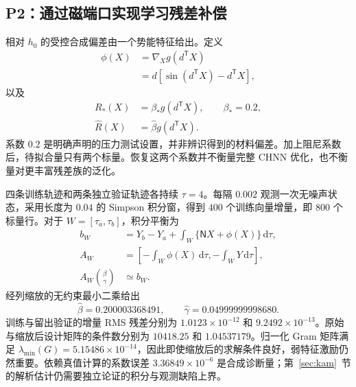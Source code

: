 \subsection{P2：通过磁端口实现学习残差补偿}
\label{num:p2}
\label{num:route-a}
相对 $h_0$ 的受控合成偏差由一个势能特征给出。定义
\begin{equation}
 \begin{split}
 \phi(X)&=\nabla_X g(d^{\mathsf T}X)\\
        &=d[\sin(d^{\mathsf T}X)-d^{\mathsf T}X],
 \end{split}
 \label{num:feature-gradient}
\end{equation}
以及
\begin{equation}
 \begin{split}
 R_*(X)&=\beta_*g(d^{\mathsf T}X),\qquad \beta_*=0.2,\\
 \widehat R(X)&=\widehat\beta g(d^{\mathsf T}X).
 \end{split}
 \label{num:feature}
\end{equation}
系数 $0.2$ 是明确声明的压力测试设置，并非辨识得到的材料偏差。加上阻尼系数后，待拟合量只有两个标量。恢复这两个系数并不衡量完整 CHNN 优化，也不衡量对更丰富残差族的泛化。

\label{num:identification}
四条训练轨迹和两条独立验证轨迹各持续 $\tau=4$。每隔 $0.002$ 观测一次无噪声状态，采用长度为 $0.04$ 的 Simpson 积分窗，得到 $400$ 个训练向量增量，即 $800$ 个标量行。对于 $W=[\tau_a,\tau_b]$，积分平衡为
\begin{equation}
 \begin{split}
 b_W&=Y_b-Y_a+\int_W\{\mathsf NX+\phi(X)\}\,\mathrm d\tau,\\
 A_W&=\left[-\int_W\phi(X)\,\mathrm d\tau,
                 -\int_WY\,\mathrm d\tau\right],\\
 A_W\binom{\beta}{\gamma}&\simeq b_W.
 \end{split}
 \label{num:regression}
\end{equation}
经列缩放的无约束最小二乘给出
\begin{equation}
 \widehat\beta=0.200003368491,\qquad
 \widehat\gamma=0.04999999998680.
 \label{num:fitted-values}
\end{equation}
训练与留出验证的增量 RMS 残差分别为 $1.0123\times10^{-12}$ 和 $9.2492\times10^{-13}$。原始与缩放后设计矩阵的条件数分别为 $10418.25$ 和 $1.04537179$。归一化 Gram 矩阵满足 $\lambda_{\min}(G)=5.15486\times10^{-14}$，因此即使缩放后的求解条件良好，弱特征激励仍然重要。依赖真值计算的系数误差 $3.36849\times10^{-6}$ 是合成诊断量；第~\ref{sec:kam}~节的解析估计仍需要独立论证的积分与观测缺陷上界。

